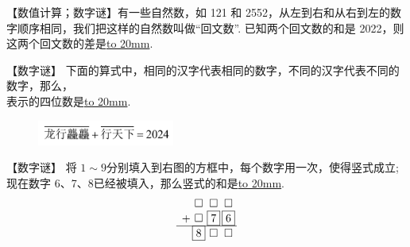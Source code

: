 \item {
    【数值计算；数字谜】有一些自然数，如 121 和 2552，从左到右和从右到左的数字顺序相同，我们把这样的自然数叫做``回文数''. 已知两个回文数的和是 2022，则这两个回文数的差是\underline{\hbox to 20mm{}}.
    \vspace{1cm}
}


\item {
    【数字谜】
    下面的算式中，相同的汉字代表相同的数字，不同的汉字代表不同的数字，那么，\\ 表示的四位数是\underline{\hbox to 20mm{}}.
    \begin{figure}[H] 
        \centering
        \includegraphics[width=0.4\textwidth]{./pics/Chapter_7/2.png}
    \end{figure}
    \vspace{1cm}
}

\item {
    【数字谜】
    将 $1\sim 9$分别填入到右图的方框中，每个数字用一次，使得竖式成立;现在数字 6、7、8已经被填入，那么竖式的和是\underline{\hbox to 20mm{}}.
    \[
    \begin{array}{l@{\,} c@{\,} c@{\,} c@{\,}}
    & \square & \square & \square \\
    + & \square  & \boxed{7} & \boxed{6} \\
    \cline{1-4}
    & \boxed{8} & \square & \square \\
    \end{array}
    \]
    \vspace{1cm}
}

